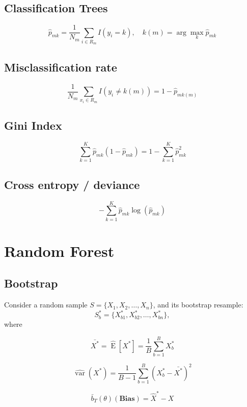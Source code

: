 \documentclass[a4paper,9pt,fleqn]{extarticle}
\DeclareMathOperator{\E}{E}
\DeclareMathOperator{\var}{var}
\begin{document}
\subsection*{Classification Trees}
\[
\hat{p}_{mk} = \frac{1}{N_m}\sum_{i \in R_m}I(y_i = k), \quad k(m) = \arg \max_{k} \hat{p}_{mk}
\]
\begin{minipage}[t]{0.32\textwidth}
\subsection*{Misclassification rate}
\[
    \frac{1}{N_m}\sum_{x_i \in R_m}I(y_i \neq k(m)) = 1 - \hat{p}_{mk(m)}
\]
\end{minipage}
\hfill
\begin{minipage}[t]{0.32\textwidth}
    \subsection*{Gini Index}
    \[
       \sum_{k=1}^{K}\hat{p}_{mk}(1 - \hat{p}_{mk}) = 1 - \sum_{k=1}^{K}\hat{p}_{mk}^2
    \]
    \end{minipage}
\hfill
\begin{minipage}[t]{0.32\textwidth}
    \subsection*{Cross entropy / deviance}
    \[
       - \sum_{k=1}^{K}\hat{p}_{mk}\log(\hat{p}_{mk})
    \]
    \end{minipage}

\section{Random Forest}
\subsection*{Bootstrap}
Consider a random sample \(S = \{X_1, X_2, \ldots, X_n\}\), and its bootstrap resample:
\[
    S^*_b = \{X^*_{b1}, X^*_{b2}, \ldots, X^*_{bn}\},
\]
where

\noindent
\begin{minipage}[t]{0.32\textwidth} %
    \vspace{-2em}
    \[
    \bar{X^*} = \hat{\E}[X^*] = \frac{1}{B}\sum_{b=1}^{B}X^*_b 
    \]
\end{minipage}%
\hfill %
\begin{minipage}[t]{0.32\textwidth} %
    \vspace{-2em}
    \[
    \hat{\var}{(X^*)} = \frac{1}{B-1}\sum_{b=1}^{B}(X^*_b - \bar{X^*})^2
    \]
\end{minipage}%
\hfill %
\begin{minipage}[t]{0.32\textwidth} %
    \vspace{-2em}
    \[
    \bar{b}_T(\theta)(\textbf{Bias}) = \hat{X}^* - X
    \]
\end{minipage}
\vspace{1.2em}
\end{document}
